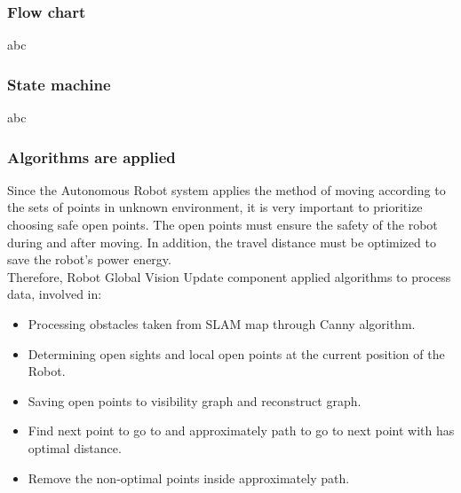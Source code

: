 \documentclass[13pt,a4paper]{article}
\begin{document}
		\subsubsection{Flow chart}
		abc
		\subsubsection{State machine}
		abc
		\subsubsection{Algorithms are applied}
		Since the Autonomous Robot system applies the method of moving according to the sets of points in unknown environment, it is very important to prioritize choosing safe open points. The open points must ensure the safety of the robot during and after moving. In addition, the travel distance must be optimized to save the robot's power energy. \\
		Therefore, Robot Global Vision Update component applied algorithms to process data, involved in:
		\begin{itemize}
			\item Processing obstacles taken from SLAM map through Canny algorithm.
			\item Determining open sights and local open points at the current position of the Robot.
			\item Saving open points to visibility graph and reconstruct graph.
			\item Find next point to go to and approximately path to go to next point with has optimal distance.
			\item Remove the non-optimal points inside approximately path.
		\end{itemize}
\end{document}
